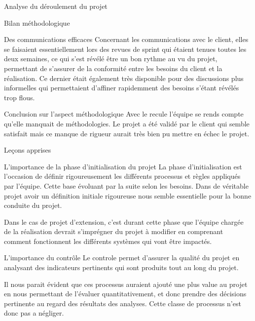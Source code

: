 \documentclass[]{article}
\begin{document}
{\begin{section}{Analyse du déroulement du projet}
\begin{subsection}{Bilan méthodologique}
\begin{subsubsection}{Des communications efficaces}
         Concernant les communications avec le client, elles se faisaient essentiellement lors des revues de sprint qui étaient tenues toutes les deux semaines, ce qui s'est révélé être un bon rythme au vu du projet, permettant de s'assurer de la conformité entre les besoins du client et la réalisation. Ce dernier était également très disponible pour des discussions plus informelles qui permettaient d'affiner rapidemment des besoins s'étant révélés trop flous.
     \end{subsubsection}


     \begin{subsubsection}{Conclusion sur l'aspect méthodologique}
        Avec le recule l'équipe se rends compte qu'elle manquait de méthodologies. Le projet a été validé par le client qui semble satisfait mais ce manque de rigueur aurait très bien pu mettre en échec le projet.
     \end{subsubsection}
 \end{subsection}
\end{section}

\begin{section}{Leçons apprises}
 \begin{subsection}{L'importance de la phase d'initialisation du projet}
     La phase d'initialisation est l'occasion de définir rigoureusement les différents processus et règles appliqués par l'équipe. Cette base évoluant par la suite selon les besoins. Dans de véritable projet avoir un définition initiale rigoureuse nous semble essentielle pour la bonne conduite du projet.

     Dans le cas de projet d'extension, c'est durant cette phase que l'équipe chargée de la réalisation devrait s'imprégner du projet à modifier en comprenant comment fonctionnent les différents systèmes qui vont être impactés.
 \end{subsection}

 \begin{subsection}{L'importance du contrôle}
     Le controle permet d'assurer la qualité du projet en analysant des indicateurs pertinents qui sont produits tout au long du projet.

     Il nous parait évident que ces processus auraient ajouté une plus value au projet en nous permettant de l'évaluer quantitativement, et donc prendre des décisions pertinente au regard des résultats des analyses. Cette classe de processus n'est donc pas a négliger.
 \end{subsection}


\end{section}}
\end{document}
